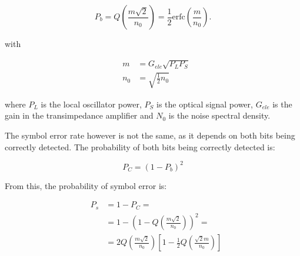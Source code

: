 


\begin{equation}\label{eq:berBPSK}
P_b= Q\left({\frac{m\sqrt{2}}{n_0}}\right) = \frac{1}{2} \text{erfc}\left({\frac{m}{n_0}}\right).
\end{equation}

with


\begin{eqnarray}
&m &= G_{ele} \sqrt{P_L P_S} \\
&n_0 &= \sqrt{\frac{1}{2} n_0}
\end{eqnarray}

where $P_L$ is the local oscillator power, $P_S$ is the optical signal power, $G_{ele}$ is the gain in the transimpedance amplifier and $N_0$ is the noise spectral density.

The symbol error rate however is not the same, as it depends on both bits being correctly detected. The probability of both bits being correctly detected is:

\begin{equation}
P_C = (1 - P_b)^2
\end{equation}

From this, the probability of symbol error is:

\begin{eqnarray}
&P_s &= 1-P_C =\nonumber \\
&	   &= 1 - \left(1 - Q \left({\frac{m \sqrt{2}}{n_0}}\right)\right)^2 = \nonumber \\
&	   &= 2 Q\left({\frac{m \sqrt{2}}{n_0}}\right)\left[1-\frac{1}{2} Q \left({\frac{\sqrt{2} m}{n_0}}\right)\right]
\end{eqnarray}

